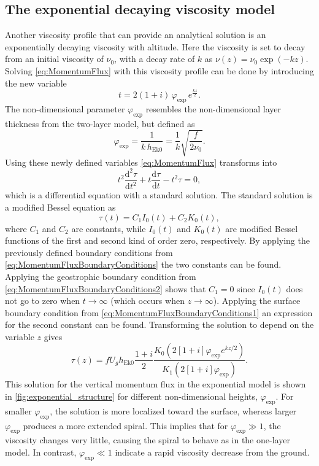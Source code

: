 \subsection{The exponential decaying viscosity model}
Another viscosity profile that can provide an analytical solution is an exponentially decaying viscosity with altitude. Here the viscosity is set to decay from an initial viscosity of $\nu_0$, with a decay rate of $k$ as $\nu(z)=\nu_0\exp\left(-kz\right)$. Solving \autoref{eq:MomentumFlux} with this viscosity profile can be done by introducing the new variable 
\begin{equation}
    t=2\left(1+i\right)\,\varphi_\text{exp}\, e^{\frac{kz}{2}}.
\end{equation}
The non-dimensional parameter $\varphi_\text{exp}$ resembles the non-dimensional layer thickness from the two-layer model, but defined as 
\begin{equation}
    \varphi_\text{exp}=\frac{1}{k\,h_\text{Ek0}}=\frac{1}{k}\sqrt{\frac{f}{2\nu_0}}.
\end{equation}
Using these newly defined variables \autoref{eq:MomentumFlux} transforms into 
\begin{equation}
    t^2\frac{\mathrm{d}^2 \tau}{\mathrm{d} t^2}+t\frac{\mathrm{d} \tau}{\mathrm{d} t}-t^2\tau=0,
\end{equation}
which is a differential equation with a standard solution. The standard solution is a modified Bessel equation as 
\begin{equation}
    \tau(t)=C_1I_0(t)+C_2K_0(t),
\end{equation}
where $C_1$ and $C_2$ are constants, while $I_0(t)$ and $K_0(t)$ are modified Bessel functions of the first and second kind of order zero, respectively. By applying the previously defined boundary conditions from \autoref{eq:MomentumFluxBoundaryConditions} the two constants can be found. Applying the geostrophic boundary condition from \autoref{eq:MomentumFluxBoundaryConditions2} shows that $C_1=0$ since $I_0(t)$ does not go to zero when $t\to\infty$ (which occurs when $z\to\infty$). Applying the surface boundary condition from \autoref{eq:MomentumFluxBoundaryConditions1} an expression for the second constant can be found. Transforming the solution to depend on the variable $z$ gives
\begin{equation}
    \tau(z)=fU_gh_\text{Ek0}\frac{1+i}
    {2}
    \frac{K_0\left(2\left[1+i\right]\varphi_\text{exp} e^{kz/2}\right)}{K_1\left(2\left[1+i\right]\varphi_\text{exp}\right)}.
    \label{eq:exponetial}
\end{equation}
This solution for the vertical momentum flux in the exponential model is shown in \autoref{fig:exponential_structure} for different non-dimensional heights, $\varphi_\text{exp}$. For smaller $\varphi_\text{exp}$, the solution is more localized toward the surface, whereas larger $\varphi_\text{exp}$ produces a more extended spiral. This implies that for $\varphi_\text{exp}\gg1$, the viscosity changes very little, causing the spiral to behave as in the one-layer model. In contrast, $\varphi_\text{exp}\ll 1$ indicate a rapid viscosity decrease from the ground.

